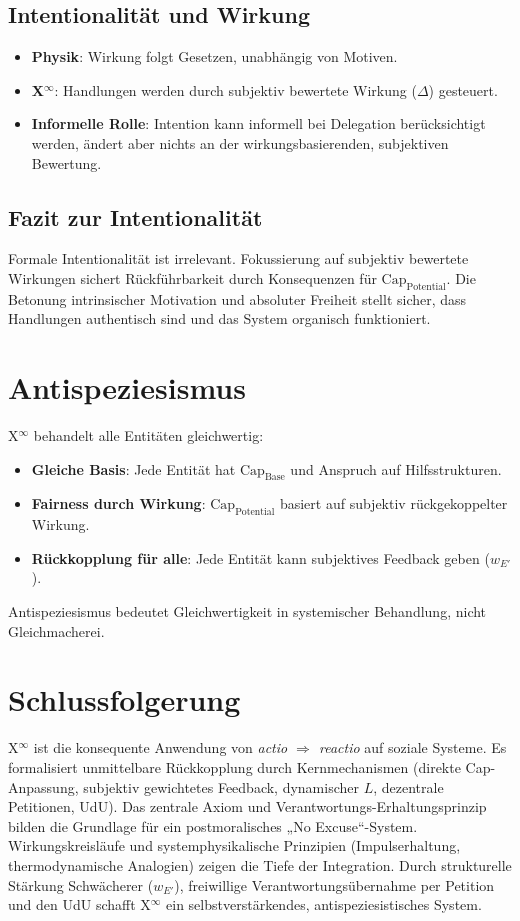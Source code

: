 \documentclass[12pt]{scrartcl}
\begin{document}
\subsection{Intentionalität und Wirkung}
\begin{itemize}
    \item \textbf{Physik}: Wirkung folgt Gesetzen, unabhängig von Motiven.
    \item \textbf{X$^\infty$}: Handlungen werden durch subjektiv bewertete Wirkung ($\Delta$) gesteuert.
    \item \textbf{Informelle Rolle}: Intention kann informell bei Delegation berücksichtigt werden, ändert aber nichts an der wirkungsbasierenden, subjektiven Bewertung.
\end{itemize}

\subsection{Fazit zur Intentionalität}
Formale Intentionalität ist irrelevant. Fokussierung auf subjektiv bewertete Wirkungen sichert Rückführbarkeit durch Konsequenzen für $\text{Cap}_{\text{Potential}}$. Die Betonung intrinsischer Motivation und absoluter Freiheit stellt sicher, dass Handlungen authentisch sind und das System organisch funktioniert.

\section{Antispeziesismus}
X$^\infty$ behandelt alle Entitäten gleichwertig:
\begin{itemize}
    \item \textbf{Gleiche Basis}: Jede Entität hat $\text{Cap}_{\text{Base}}$ und Anspruch auf Hilfsstrukturen.
    \item \textbf{Fairness durch Wirkung}: $\text{Cap}_{\text{Potential}}$ basiert auf subjektiv rückgekoppelter Wirkung.
    \item \textbf{Rückkopplung für alle}: Jede Entität kann subjektives Feedback geben ($w_{E'}$).
\end{itemize}
Antispeziesismus bedeutet Gleichwertigkeit in systemischer Behandlung, nicht Gleichmacherei.

\section{Schlussfolgerung}
X$^\infty$ ist die konsequente Anwendung von \emph{actio $\Rightarrow$ reactio} auf soziale Systeme. Es formalisiert unmittelbare Rückkopplung durch Kernmechanismen (direkte Cap-Anpassung, subjektiv gewichtetes Feedback, dynamischer $L$, dezentrale Petitionen, UdU). Das zentrale Axiom und Verantwortungs-Erhaltungsprinzip bilden die Grundlage für ein postmoralisches „No Excuse“-System. Wirkungskreisläufe und systemphysikalische Prinzipien (Impulserhaltung, thermodynamische Analogien) zeigen die Tiefe der Integration. Durch strukturelle Stärkung Schwächerer ($w_{E'}$), freiwillige Verantwortungsübernahme per Petition und den UdU schafft X$^\infty$ ein selbstverstärkendes, antispeziesistisches System.
\end{document}
